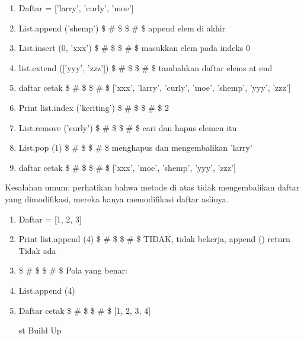 \begin{enumerate}
\item
Daftar = ['larry', 'curly', 'moe'] \par
\item
List.append ('shemp')  \$  \#  \$ \$  \#  \$ append elem di akhir \par
\item
List.insert (0, 'xxx')  \$  \#  \$ \$  \#  \$ masukkan elem pada indeks 0 \par
\item
list.extend (['yyy', 'zzz'])  \$  \#  \$ \$  \#  \$ tambahkan daftar elems at end \par
\item
daftar cetak  \$  \#  \$ \$  \#  \$ ['xxx', 'larry', 'curly', 'moe', 'shemp', 'yyy', 'zzz'] \par
\item
Print list.index ('keriting')  \$  \#  \$ \$  \#  \$ 2 \par
\vspace{12pt}
\item
List.remove ('curly')  \$  \#  \$ \$  \#  \$ cari dan hapus elemen itu \par
\item
List.pop (1)  \$  \#  \$ \$  \#  \$ menghapus dan mengembalikan 'larry' \par
\item
daftar cetak  \$  \#  \$ \$  \#  \$ ['xxx', 'moe', 'shemp', 'yyy', 'zzz'] \par
\end{enumerate}
\vspace{12pt}
Kesalahan umum: perhatikan bahwa metode di atas tidak \* mengembalikan \* daftar yang dimodifikasi, mereka hanya memodifikasi daftar aslinya. \par
\vspace{12pt}
\begin{enumerate}
\item
Daftar = [1, 2, 3] \par
\item
Print list.append (4)  \$  \#  \$ \$  \#  \$ TIDAK, tidak bekerja, append () return Tidak ada \par
\item
\$  \#  \$ \$  \#  \$ Pola yang benar: \par
\item
List.append (4) \par
\item
Daftar cetak  \$  \#  \$ \$  \#  \$ [1, 2, 3, 4] \par
st Build Up \par
\end{enumerate}
